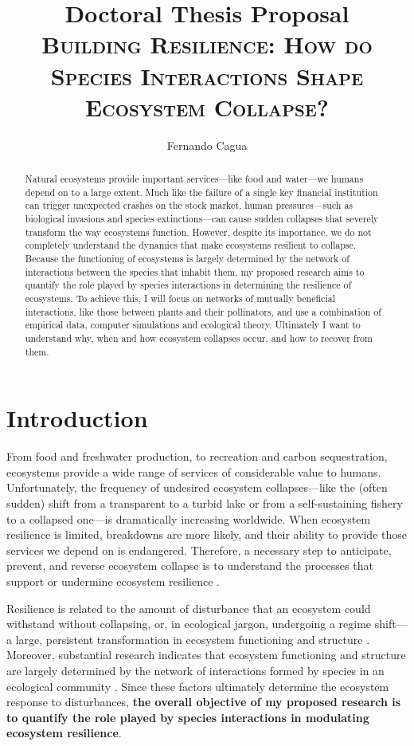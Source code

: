 \documentclass[a4paper]{article}
\title{
	{\normalsize Doctoral Thesis Proposal} \\
	{\LARGE \textsc{Building Resilience: How do Species Interactions Shape Ecosystem Collapse?}}
}
\author{
  {\large Fernando Cagua}
}
\date{}
\begin{document}
\maketitle

\begin{abstract}
  Natural ecosystems provide important services---like food and water---we humans depend on to a large extent.
  Much like the failure of a single key financial institution can trigger unexpected crashes on the stock market, human pressures---such as biological invasions and species extinctions---can cause sudden collapses that severely transform the way ecosystems function.
  However, despite its importance, we do not completely understand the dynamics that make ecosystems resilient to collapse.
  Because the functioning of ecosystems is largely determined by the network of interactions between the species that inhabit them, my proposed research aims to quantify the role played by species interactions in determining the resilience of ecosystems.
  To achieve this, I will focus on networks of mutually beneficial interactions, like those between plants and their pollinators, and use a combination of empirical data, computer simulations and ecological theory.
  Ultimately I want to understand why, when and how ecosystem collapses occur, and how to recover from them.
\end{abstract}




\section*{Introduction}

From food and freshwater production, to recreation and carbon sequestration, ecosystems provide a wide range of services of considerable value to humans.
Unfortunately, the frequency of undesired ecosystem collapses---like the (often sudden) shift from a transparent to a turbid lake or from a self-sustaining fishery to a collapsed one---is dramatically increasing worldwide\citep{Scheffer2001a}.
When ecosystem resilience is limited, breakdowns are more likely, and their ability to provide those services we depend on is endangered.
Therefore, a necessary step to anticipate, prevent, and reverse ecosystem collapse is to understand the processes that support or undermine ecosystem resilience \citep{Hughes2005, Tylianakis2008}.

Resilience is related to the amount of disturbance that an ecosystem could withstand without collapsing, or, in ecological jargon, undergoing a regime shift---a large, persistent transformation in ecosystem functioning and structure \citep{Holling1973, Gunderson2000}.
Moreover, substantial research indicates that ecosystem functioning and structure are largely determined by the network of interactions formed by species in an ecological community \citep{Bascompte2006, Dobson2006, Tylianakis2008, Reiss2009}.
Since these factors ultimately determine the ecosystem response to disturbances, \textbf{the overall objective of my proposed research is to quantify the role played by species interactions in modulating ecosystem resilience}.
\end{document}
